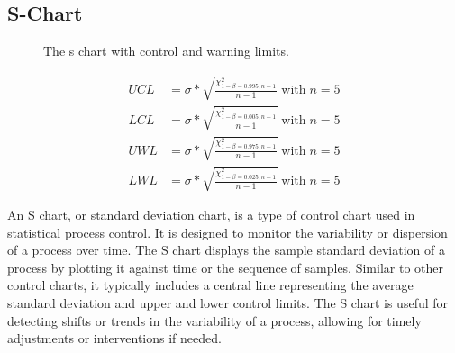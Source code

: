 \documentclass[
  a4paper,
]{scrbook}
\begin{document}
\subsection{S-Chart}\label{s-chart}

\begin{figure}[H]


\caption{\label{fig-s-chart}The s chart with control and warning
limits.}

\end{figure}%

\begin{align}
UCL &= \sigma * \sqrt{\frac{\chi^2_{1-\beta=0.995;n-1}}{n-1}} \;\text{with}\;n=5 \\
LCL &= \sigma * \sqrt{\frac{\chi^2_{1-\beta=0.005;n-1}}{n-1}} \;\text{with}\;n=5 \\
UWL &= \sigma * \sqrt{\frac{\chi^2_{1-\beta=0.975;n-1}}{n-1}} \;\text{with}\;n=5 \\
LWL &= \sigma * \sqrt{\frac{\chi^2_{1-\beta=0.025;n-1}}{n-1}} \;\text{with}\;n=5
\end{align}

An S chart, or standard deviation chart, is a type of control chart used
in statistical process control. It is designed to monitor the
variability or dispersion of a process over time. The S chart displays
the sample standard deviation of a process by plotting it against time
or the sequence of samples. Similar to other control charts, it
typically includes a central line representing the average standard
deviation and upper and lower control limits. The S chart is useful for
detecting shifts or trends in the variability of a process, allowing for
timely adjustments or interventions if needed.
\end{document}
